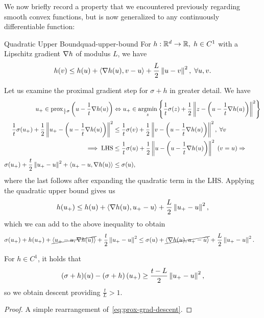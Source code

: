 We now briefly record a property that we encountered previously regarding smooth
convex functions, but is now generalized to any continuously differentiable 
function:
\begin{cproposition}{Quadratic Upper Bound}{quad-upper-bound}
    For $h : \mathbb{R}^d \to \mathbb{R}, \; h \in C^1$ with a Lipschitz gradient $\nabla h$
    of modulus $L$, we have
    \[
        h(v) \leq h(u) + \left\langle \nabla h(u), v - u \right\rangle + \frac{L}{2} \left \| u - v \right \|^2,
        \; \forall u, v.
    \]
\end{cproposition}

Let us examine the proximal gradient step for $\sigma + h$ in greater detail. 
We have
\begin{align*}
    u_+ \in \mathrm{prox}_{\frac{1}{t} \sigma}\left( u - \frac{1}{t} \nabla h(u) \right) &
    \Leftrightarrow u_+ \in \operatorname*{argmin}_{z} \left\{  \frac{1}{t} \sigma(z) +
        \frac{1}{2} \left \| z - \left(u - \frac{1}{t} \nabla h(u)\right) \right \|^2 \right\} \\
    \frac{1}{t} \sigma(u_+) + \frac{1}{2} \left \| u_+ - \left( u - \frac{1}{t} 
    \nabla h(u)\right) \right \|^2 &\leq \frac{1}{t} \sigma(v) + \frac{1}{2}
    \left \| v - \left(u - \frac{1}{t} \nabla h(u)\right) \right \|^2, \; \forall v \\
    \implies \mathrm{LHS} &\leq \frac{1}{t} \sigma(u) + \frac{1}{2}
        \left \| u - \left(u - \frac{1}{t} \nabla h(u)\right) \right \|^2 \; (v = u) 
        \Rightarrow \\
    \sigma(u_+) + \frac{t}{2} \left \| u_+ - u \right \|^2 + \left\langle u_+ - u, \nabla h(u) \right\rangle
    &\leq \sigma(u),
\end{align*}
where the last follows after expanding the quadratic term in the LHS. Applying
the quadratic upper bound gives us
\[
    h(u_+) \leq h(u) + \left\langle \nabla h(u), u_+ - u \right\rangle + \frac{L}{2} \left \| u_+ - u \right \|^2,
\]
which we can add to the above inequality to obtain
\begin{align}
    \sigma(u_+) + h(u_+) + \cancel{\left\langle u_+ - u, \nabla h(u) \right\rangle} + \frac{t}{2}
    \left \| u_+ - u \right \|^2 &\leq \sigma(u) + \cancel{\left\langle \nabla h(u), u_+ - u \right\rangle} + 
    \frac{L}{2} \left \| u_+ - u \right \|^2
    \label{eq:prox-grad-descent}.
\end{align}
\begin{lemma}
    \label{lemma:proxgrad-descent}
    For $h \in C^1$, it holds that
    \[
        (\sigma + h)(u) - \left( \sigma + h \right)(u_+) \geq
        \frac{t - L}{2} \left \| u_+ - u \right \|^2,
    \]
    so we obtain descent providing $\frac{t}{L} > 1$.
\end{lemma}
\begin{proof}
    A simple rearrangement of~\cref{eq:prox-grad-descent}.
\end{proof}

